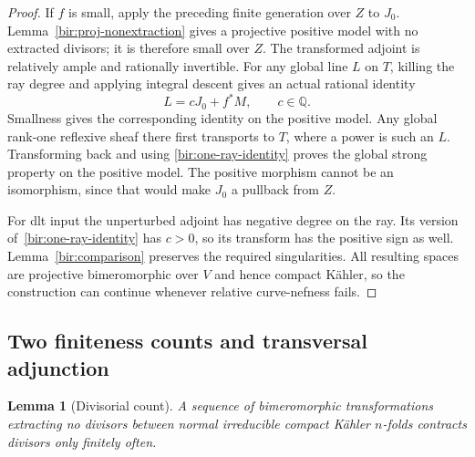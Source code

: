 \documentclass[11pt,letterpaper]{article}
\newtheorem{lemma}[theorem]{Lemma}
\theoremstyle{definition}
\theoremstyle{remark}
\begin{document}
\begin{proof}
If $f$ is small, apply the preceding finite generation over $Z$ to
$J_0$.  Lemma~\ref{bir:proj-nonextraction} gives a projective positive
model with no extracted divisors; it is therefore small over $Z$.
The transformed adjoint is relatively ample and rationally invertible.
For any global line $L$ on $T$, killing the ray degree and applying
integral descent gives an actual rational identity
\begin{equation}
 L=cJ_0+f^*M,\qquad c\in\mathbb{Q}.
 \label{bir:one-ray-identity}
\end{equation}
Smallness gives the corresponding identity on the positive model.
Any global rank-one reflexive sheaf there first transports to $T$,
where a power is such an $L$.  Transforming back and using
\eqref{bir:one-ray-identity} proves the global strong property on the
positive model.  The positive morphism cannot be an isomorphism,
since that would make $J_0$ a pullback from $Z$.

For dlt input the unperturbed adjoint has negative degree on the ray.
Its version of~\eqref{bir:one-ray-identity} has $c>0$, so its transform
has the positive sign as well.  Lemma~\ref{bir:comparison} preserves
the required singularities.  All resulting spaces are projective
bimeromorphic over $V$ and hence compact K\"ahler, so the construction
can continue whenever relative curve-nefness fails.
\end{proof}

\subsection{Two finiteness counts and transversal adjunction}
\label{bir:counts}

\begin{lemma}[Divisorial count]
\label{bir:cycle-count}
A sequence of bimeromorphic transformations extracting no divisors
between normal irreducible compact K\"ahler $n$-folds contracts
divisors only finitely often.
\end{lemma}
\end{document}
